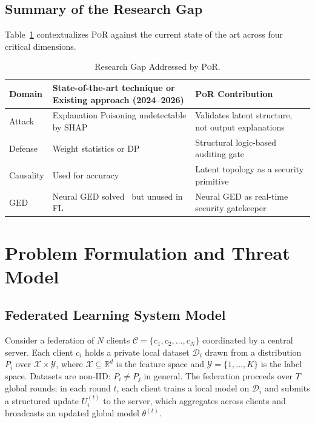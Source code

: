 \documentclass[journal]{IEEEtran}
\newcommand{\por}{\textsc{PoR}}
\newcommand{\RR}{\mathbb{R}}
\newcommand{\calC}{\mathcal{C}}
\newcommand{\calD}{\mathcal{D}}
\newcommand{\calX}{\mathcal{X}}
\newcommand{\calY}{\mathcal{Y}}
\begin{document}
\subsection{Summary of the Research Gap}

Table~\ref{tab:research_gap} contextualizes \por{} against the current
state of the art across four critical dimensions.

\begin{table}[t]
\centering
\caption{Research Gap Addressed by \por{}.}
\label{tab:research_gap}
\setlength{\tabcolsep}{4pt}
\begin{tabular}{p{1.5cm}p{3cm}p{3cm}}
\toprule
\textbf{Domain} & \textbf{State-of-the-art technique or Existing approach
  (2024--2026)} & \textbf{\por{} Contribution} \\
\midrule
Attack       & Explanation Poisoning undetectable by SHAP~\cite{liyanage2024scaffolding,slack2020fooling} & Validates latent structure, not output explanations \\
Defense      & Weight statistics or DP~\cite{zhang2024fedredefense,esfl2025} & Structural logic-based auditing gate \\
Causality    & Used for accuracy~\cite{fedecd2024,fedcausal2025} & Latent topology as a security primitive \\
GED          & Neural GED solved~\cite{graphedx2024} but unused in FL & Neural GED as real-time security gatekeeper \\
\bottomrule
\end{tabular}
\end{table}

\section{Problem Formulation and Threat Model}
\label{sec:problem}

\subsection{Federated Learning System Model}

Consider a federation of $N$ clients $\calC = \{c_1, c_2, \ldots, c_N\}$
coordinated by a central server. Each client $c_i$ holds a private local
dataset $\calD_i$ drawn from a distribution $P_i$ over $\calX \times \calY$,
where $\calX \subseteq \RR^d$ is the feature space and
$\calY = \{1, \ldots, K\}$ is the label space. Datasets are non-IID:
$P_i \neq P_j$ in general. The federation proceeds over $T$ global rounds;
in each round $t$, each client trains a local model on $\calD_i$ and submits
a structured update $U_i^{(t)}$ to the server, which aggregates across
clients and broadcasts an updated global model $\theta^{(t)}$.
\end{document}
